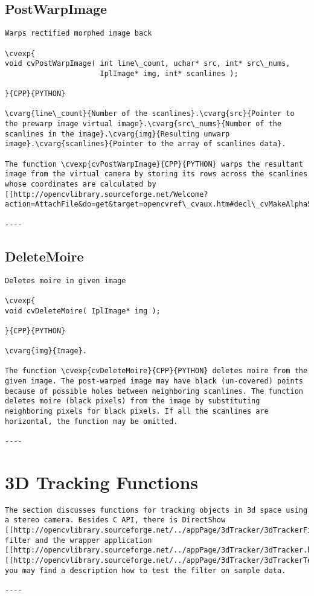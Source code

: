 \subsection{PostWarpImage}
\begin{verbatim}
Warps rectified morphed image back

\cvexp{
void cvPostWarpImage( int line\_count, uchar* src, int* src\_nums,
                      IplImage* img, int* scanlines );

}{CPP}{PYTHON}

\cvarg{line\_count}{Number of the scanlines}.\cvarg{src}{Pointer to the prewarp image virtual image}.\cvarg{src\_nums}{Number of the scanlines in the image}.\cvarg{img}{Resulting unwarp image}.\cvarg{scanlines}{Pointer to the array of scanlines data}.

The function \cvexp{cvPostWarpImage}{CPP}{PYTHON} warps the resultant image from the virtual camera by storing its rows across the scanlines whose coordinates are calculated by [[http://opencvlibrary.sourceforge.net/Welcome?action=AttachFile&do=get&target=opencvref\_cvaux.htm#decl\_cvMakeAlphaScanlines|cvMakeAlphaScanlines]].

----
\end{verbatim}
\subsection{DeleteMoire}
\begin{verbatim}
Deletes moire in given image

\cvexp{
void cvDeleteMoire( IplImage* img );

}{CPP}{PYTHON}

\cvarg{img}{Image}.

The function \cvexp{cvDeleteMoire}{CPP}{PYTHON} deletes moire from the given image. The post-warped image may have black (un-covered) points because of possible holes between neighboring scanlines. The function deletes moire (black pixels) from the image by substituting neighboring pixels for black pixels. If all the scanlines are horizontal, the function may be omitted.

----
\end{verbatim}
\section{3D Tracking Functions}
\begin{verbatim}
The section discusses functions for tracking objects in 3d space using a stereo camera. Besides C API, there is DirectShow [[http://opencvlibrary.sourceforge.net/../appPage/3dTracker/3dTrackerFilter.htm|3dTracker]] filter and the wrapper application [[http://opencvlibrary.sourceforge.net/../appPage/3dTracker/3dTracker.htm|3dTracker]]. [[http://opencvlibrary.sourceforge.net/../appPage/3dTracker/3dTrackerTesting.htm|Here]] you may find a description how to test the filter on sample data.

----
\end{verbatim}
